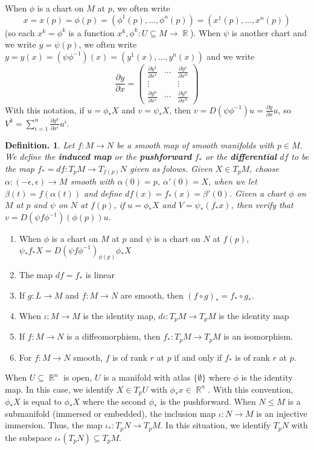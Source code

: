\documentclass[11pt, a4paper]{memoir}
\DeclareMathOperator{\R}{{\mathbb{R}}}
\theoremstyle{change}
\theoremstyle{plain}
\theoremstyle{nonumberplain}
\newtheorem{definition}{Definition.}
\newcommand{\prt}[2]{\ensuremath{\frac{\partial #1}{\partial #2}}}
\numberwithin{equation}{section}
\begin{document}
When $\phi$ is a chart on $M$ at $p$, we often write
\begin{equation*}
    x=x(p)=\phi(p)=(\phi^1(p),\ldots,\phi^n(p))=(x^1(p),\ldots,x^n(p))
\end{equation*}
(so each $x^k=\phi^k$ is a function $x^k,\phi^k:U\subseteq M\to\R$).
When $\psi$ is another chart and we write $y=\psi(p)$, we often write $y=y(x)=(\psi\phi^{-1})(x)=(y^1(x),\ldots,y^n(x))$ and we write
\begin{equation*}
    \prt{y}{x}=
    \begin{pmatrix}
        \prt{y^1}{x^1} & \cdots & \prt{y^1}{x^n}\\
        \vdots &&\vdots\\
        \prt{y^n}{x^1} & \cdots & \prt{y^n}{x^n}
    \end{pmatrix}
\end{equation*}
With this notation, if $u=\phi_*X$ and $v=\psi_*X$, then $v=D(\psi\phi^{-1})u=\prt{y}{x}u$, so $V^k=\sum_{i=1}^n\prt{y^k}{x^i}u^i$.
\begin{definition}
    Let $f:M\to N$ be a smooth map of smooth manifolds with $p\in M$.
    We define the \textbf{induced map} or the \textbf{pushforward} $f_*$ or the \textbf{differential} $df$ to be the map $f_*=df:T_pM\to T_{f(p)}N$ given as folows.
    Given $X\in T_pM$, choose $\alpha:(-\epsilon,\epsilon)\to M$ smooth with $\alpha(0)=p$, $\alpha'(0)=X$, when we let $\beta(t)=f(\alpha(t))$ and define $df(x)=f_*(x)=\beta'(0)$.
    Given a chart $\phi$ on $M$ at $p$ and $\psi$ on $N$ at $f(p)$, if $u=\phi_*X$ and $V=\psi_*(f_*x)$, then verify that $v=D(\psi f\phi^{-1})(\phi(p))u$.
\end{definition}
\begin{enumerate}[nl]
    \item When $\phi$ is a chart on $M$ at $p$ and $\psi$ is a chart on $N$ at $f(p)$, $\psi_*f_*X=D(\psi f\phi^{-1})_{\phi(p)}\phi_*X$
    \item The map $df=f_*$ is linear
    \item If $g:L\to M$ and $f:M\to N$ are smooth, then $(f\circ g)_*=f_*\circ g_*$.
    \item When $\iota:M\to M$ is the identity map, $d\iota:T_pM\to T_pM$ is the identity map
    \item If $f:M\to N$ is a diffeomorphism, then $f_*:T_pM\to T_pM$ is an isomorphism.
    \item For $f:M\to N$ smooth, $f$ is of rank $r$ at $p$ if and only if $f_*$ is of rank $r$ at $p$.
\end{enumerate}
When $U\subseteq\R^n$ is open, $U$ is a manifold with atlas $\{\emptyset\}$ where $\phi$ is the identity map.
In this case, we identify $X\in T_pU$ with $\phi_*x\in\R^n$.
With this convention, $\phi_*X$ is equal to $\phi_*X$ where the second $\phi_*$ is the pushforward.
When $N\leq M$ is a submanifold (immersed or embedded), the inclusion map $\iota:N\to M$ is an injective immersion.
Thus, the map $\iota_*:T_pN\to T_pM$.
In this situation, we identify $T_pN$ with the subspace $\iota_*(T_pN)\subseteq T_pM$.
\end{document}
